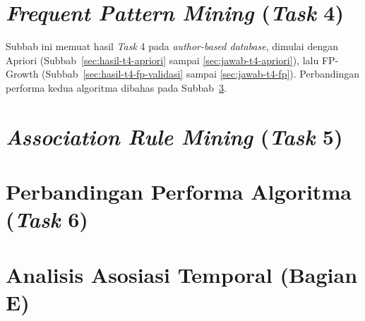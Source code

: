 \section{\textit{Frequent Pattern Mining} (\textit{Task} 4)}
\label{sec:hasil-t4}
Subbab ini memuat hasil \textit{Task} 4 pada \textit{author-based database}, dimulai dengan Apriori \cite{agrawal1994} (Subbab~\ref{sec:hasil-t4-apriori} sampai \ref{sec:jawab-t4-apriori}), lalu FP-Growth \cite{han2000} (Subbab~\ref{sec:hasil-t4-fp-validasi} sampai \ref{sec:jawab-t4-fp}). Perbandingan performa kedua algoritma dibahas pada Subbab~\ref{sec:hasil-t6}.




\section{\textit{Association Rule Mining} (\textit{Task} 5)}
\label{sec:hasil-t5}


\section{Perbandingan Performa Algoritma (\textit{Task} 6)}
\label{sec:hasil-t6}


\section{Analisis Asosiasi Temporal (Bagian E)}
\label{sec:hasil-e}

